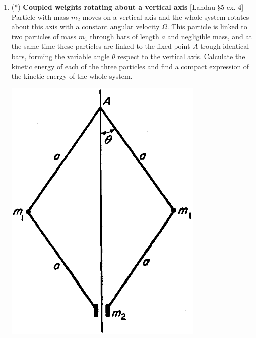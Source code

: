 \documentclass[11pt, a4paper, twoside]{article}
\begin{document}
\begin{enumerate}
\item
	\begin{minipage}[t][4.5cm]{0.65\textwidth}
		(*) \textbf{Coupled weights rotating about a vertical axis} [Landau \S5 ex. 4]\\
		Particle with mass $m_2$ moves on a vertical axis and the whole system rotates about this axis with a constant angular velocity $\Omega$. This particle is linked to two particles of mass $m_1$ through bars of length $a$ and negligible mass, and at the same time these particles are linked to the fixed point $A$ trough identical bars, forming the variable angle $\theta$ respect to the vertical axis.
		Calculate the kinetic energy of each of the three particles and find a compact expression of the kinetic energy of the whole system.
	\end{minipage}
	\begin{minipage}[c][1cm][t]{0.35\textwidth}
		\includegraphics[width=0.75\textwidth]{figures/landauS52_fig4.png}
	\end{minipage}


\end{enumerate}
\end{document}
